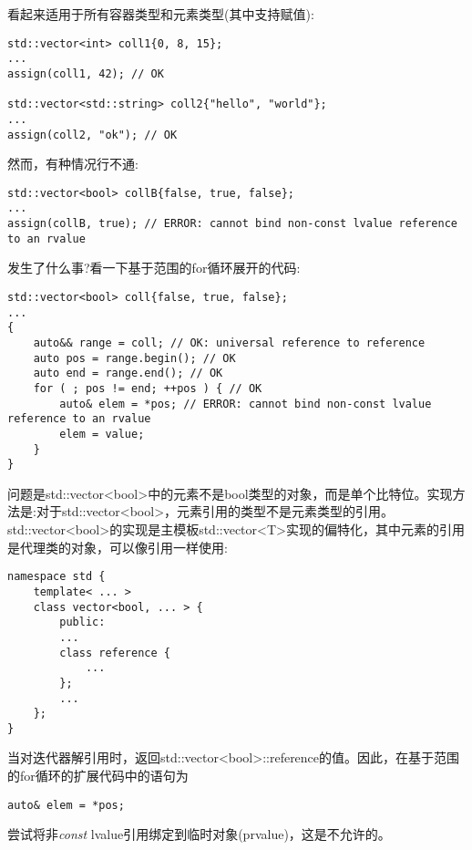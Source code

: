 看起来适用于所有容器类型和元素类型(其中支持赋值):\par

\begin{lstlisting}[caption={}]
std::vector<int> coll1{0, 8, 15};
...
assign(coll1, 42); // OK

std::vector<std::string> coll2{"hello", "world"};
...
assign(coll2, "ok"); // OK
\end{lstlisting}

然而，有种情况行不通:\par

\begin{lstlisting}[caption={}]
std::vector<bool> collB{false, true, false};
...
assign(collB, true); // ERROR: cannot bind non-const lvalue reference to an rvalue
\end{lstlisting}

发生了什么事?看一下基于范围的for循环展开的代码:\par

\begin{lstlisting}[caption={}]
std::vector<bool> coll{false, true, false};
...
{
	auto&& range = coll; // OK: universal reference to reference
	auto pos = range.begin(); // OK
	auto end = range.end(); // OK
	for ( ; pos != end; ++pos ) { // OK
		auto& elem = *pos; // ERROR: cannot bind non-const lvalue reference to an rvalue
		elem = value;
	}
}
\end{lstlisting}

问题是std::vector<bool>中的元素不是bool类型的对象，而是单个比特位。实现方法是:对于std::vector<bool>，元素引用的类型不是元素类型的引用。std::vector<bool>的实现是主模板std::vector<T>实现的偏特化，其中元素的引用是代理类的对象，可以像引用一样使用:\par

\begin{lstlisting}[caption={}]
namespace std {
	template< ... >
	class vector<bool, ... > {
		public:
		...
		class reference {
			...
		};
		...
	};
}
\end{lstlisting}

当对迭代器解引用时，返回std::vector<bool>::reference的值。因此，在基于范围的for循环的扩展代码中的语句为\par

\begin{lstlisting}[caption={}]
auto& elem = *pos;
\end{lstlisting}

尝试将非\textit{const} lvalue引用绑定到临时对象(prvalue)，这是不允许的。\par

